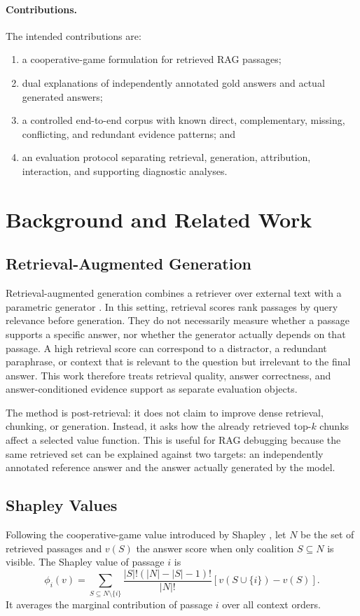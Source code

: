 \documentclass[10pt]{article}
\begin{document}
\paragraph{Contributions.}
The intended contributions are:
\begin{enumerate}
  \item a cooperative-game formulation for retrieved RAG passages;
  \item dual explanations of independently annotated gold answers and actual
  generated answers;
  \item a controlled end-to-end corpus with known direct, complementary,
  missing, conflicting, and redundant evidence patterns; and
  \item an evaluation protocol separating retrieval, generation, attribution,
  interaction, and supporting diagnostic analyses.
\end{enumerate}

\section{Background and Related Work}
\subsection{Retrieval-Augmented Generation}
Retrieval-augmented generation combines a retriever over external text with a
parametric generator \cite{lewis2020rag}. In this setting, retrieval scores
rank passages by query relevance before generation. They do not necessarily
measure whether a passage supports a specific answer, nor whether the generator
actually depends on that passage. A high retrieval score can correspond to a
distractor, a redundant paraphrase, or context that is relevant to the question
but irrelevant to the final answer. This work therefore treats retrieval
quality, answer correctness, and answer-conditioned evidence support as
separate evaluation objects.

The method is post-retrieval: it does not claim to improve dense retrieval,
chunking, or generation. Instead, it asks how the already retrieved top-$k$
chunks affect a selected value function. This is useful for RAG debugging
because the same retrieved set can be explained against two targets: an
independently annotated reference answer and the answer actually generated by
the model.

\subsection{Shapley Values}
Following the cooperative-game value introduced by Shapley
\cite{shapley1953value}, let $N$ be the set of retrieved passages and $v(S)$
the answer score when only
coalition $S \subseteq N$ is visible. The Shapley value of passage $i$ is
\begin{equation}
\phi_i(v) =
\sum_{S \subseteq N \setminus \{i\}}
\frac{|S|!(|N|-|S|-1)!}{|N|!}
\left[v(S \cup \{i\}) - v(S)\right].
\end{equation}
It averages the marginal contribution of passage $i$ over all context orders.
\end{document}
